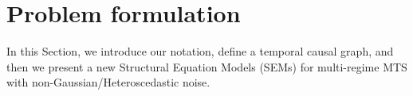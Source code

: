 \section{Problem formulation}
In this Section, we introduce our notation, define a temporal causal graph, and then we present a new Structural Equation Models (SEMs) for multi-regime MTS with non-Gaussian/Heteroscedastic noise.

